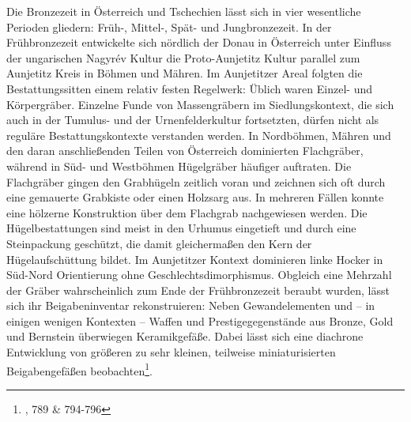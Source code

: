 \documentclass[openany,twoside,twocolumn]{book}
\let\rmarkdownfootnote\footnote%
\def\footnote{\protect\rmarkdownfootnote}
\begin{document}
Die Bronzezeit in Österreich und Tschechien lässt sich in vier wesentliche Perioden gliedern: Früh-, Mittel-, Spät- und Jungbronzezeit. In der Frühbronzezeit entwickelte sich nördlich der Donau in Österreich unter Einfluss der ungarischen Nagyrév Kultur die Proto-Aunjetitz Kultur parallel zum Aunjetitz Kreis in Böhmen und Mähren. Im Aunjetitzer Areal folgten die Bestattungssitten einem relativ festen Regelwerk: Üblich waren Einzel- und Körpergräber. Einzelne Funde von Massengräbern im Siedlungskontext, die sich auch in der Tumulus- und der Urnenfelderkultur fortsetzten, dürfen nicht als reguläre Bestattungskontexte verstanden werden. In Nordböhmen, Mähren und den daran anschließenden Teilen von Österreich dominierten Flachgräber, während in Süd- und Westböhmen Hügelgräber häufiger auftraten. Die Flachgräber gingen den Grabhügeln zeitlich voran und zeichnen sich oft durch eine gemauerte Grabkiste oder einen Holzsarg aus. In mehreren Fällen konnte eine hölzerne Konstruktion über dem Flachgrab nachgewiesen werden. Die Hügelbestattungen sind meist in den Urhumus eingetieft und durch eine Steinpackung geschützt, die damit gleichermaßen den Kern der Hügelaufschüttung bildet. Im Aunjetitzer Kontext dominieren linke Hocker in Süd-Nord Orientierung ohne Geschlechtsdimorphismus. Obgleich eine Mehrzahl der Gräber wahrscheinlich zum Ende der Frühbronzezeit beraubt wurden, lässt sich ihr Beigabeninventar rekonstruieren: Neben Gewandelementen und -- in einigen wenigen Kontexten -- Waffen und Prestigegegenstände aus Bronze, Gold und Bernstein überwiegen Keramikgefäße. Dabei lässt sich eine diachrone Entwicklung von größeren zu sehr kleinen, teilweise miniaturisierten Beigabengefäßen beobachten\footnote{\textcite{lubos_czech_2013}, 789 \& 794-796}.
\end{document}
